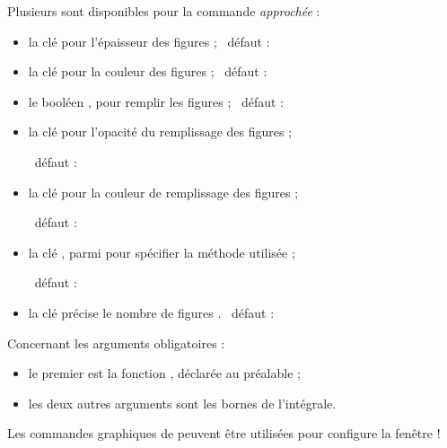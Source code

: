 \begin{cautionblock}
Plusieurs  sont disponibles pour la commande \textit{approchée} :

\begin{itemize}
	\item la clé  pour l'épaisseur des \og figures \fg{} ; \hfill~défaut : 
	\item la clé  pour la couleur des \og figures \fg{} ; \hfill~défaut : 
	\item le booléen , pour remplir les \og figures \fg{} ; \hfill~défaut : 
	\item la clé  pour l'opacité du remplissage des \og figures \fg{} ;
	
	\hfill~défaut : 
	\item la clé  pour la couleur de remplissage des \og figures \fg{} ;
	
	\hfill~défaut : 
	\item la clé , parmi  pour spécifier la méthode utilisée ;
	
	\hfill~défaut : 
	\item la clé  précise le nombre de \og figures \fg{}. \hfill~défaut : 
\end{itemize}

\smallskip

Concernant les arguments obligatoires :

\begin{itemize}
	\item le premier est la fonction , déclarée au préalable ;
	\item les deux autres arguments sont les bornes de l'intégrale.
\end{itemize}

Les commandes graphiques de  peuvent être utilisées pour configure la fenêtre !
\end{cautionblock}

\begin{PresCodePL}{}
\end{PresCodePL}

